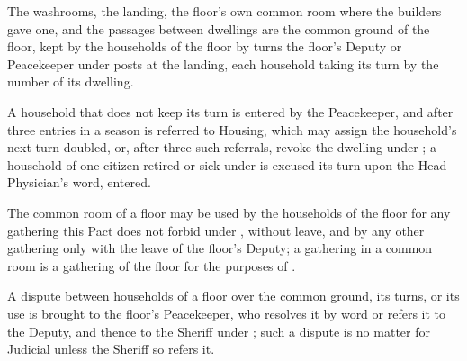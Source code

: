 \begin{clauses}
\item The washrooms, the landing, the floor's own common room where the builders gave one, and the passages between dwellings are the common ground of the floor, kept by the households of the floor by turns the floor's Deputy or Peacekeeper under  posts at the landing, each household taking its turn by the number of its dwelling.
\item A household that does not keep its turn is entered by the Peacekeeper, and after three entries in a season is referred to Housing, which may assign the household's next turn doubled, or, after three such referrals, revoke the dwelling under ; a household of one citizen retired or sick under  is excused its turn upon the Head Physician's word, entered.
\item The common room of a floor may be used by the households of the floor for any gathering this Pact does not forbid under , without leave, and by any other gathering only with the leave of the floor's Deputy; a gathering in a common room is a gathering of the floor for the purposes of .
\item A dispute between households of a floor over the common ground, its turns, or its use is brought to the floor's Peacekeeper, who resolves it by word or refers it to the Deputy, and thence to the Sheriff under ; such a dispute is no matter for Judicial unless the Sheriff so refers it.
\end{clauses}
